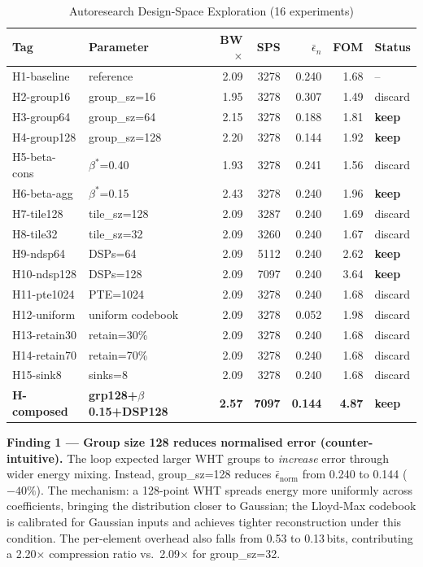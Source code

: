 \begin{table}[t]
\caption{Autoresearch Design-Space Exploration (16 experiments)}
\label{tab:dse}
\centering\small
\setlength{\tabcolsep}{4pt}
\begin{tabular}{llrrrrl}
\toprule
Tag & Parameter & BW$\times$ & SPS & $\bar\epsilon_n$ & FOM & Status \\
\midrule
H1-baseline  & reference           & 2.09 & 3278 & 0.240 & 1.68 & -- \\
\midrule
H2-group16   & group\_sz=16        & 1.95 & 3278 & 0.307 & 1.49 & discard \\
H3-group64   & group\_sz=64        & 2.15 & 3278 & 0.188 & 1.81 & \textbf{keep} \\
H4-group128  & group\_sz=128       & 2.20 & 3278 & 0.144 & 1.92 & \textbf{keep} \\
\midrule
H5-beta-cons & $\beta^*$=0.40      & 1.93 & 3278 & 0.241 & 1.56 & discard \\
H6-beta-agg  & $\beta^*$=0.15      & 2.43 & 3278 & 0.240 & 1.96 & \textbf{keep} \\
\midrule
H7-tile128   & tile\_sz=128        & 2.09 & 3287 & 0.240 & 1.69 & discard \\
H8-tile32    & tile\_sz=32         & 2.09 & 3260 & 0.240 & 1.67 & discard \\
\midrule
H9-ndsp64    & DSPs=64             & 2.09 & 5112 & 0.240 & 2.62 & \textbf{keep} \\
H10-ndsp128  & DSPs=128            & 2.09 & 7097 & 0.240 & 3.64 & \textbf{keep} \\
\midrule
H11-pte1024  & PTE=1024            & 2.09 & 3278 & 0.240 & 1.68 & discard \\
H12-uniform  & uniform codebook    & 2.09 & 3278 & 0.052 & 1.98 & discard \\
H13-retain30 & retain=30\%         & 2.09 & 3278 & 0.240 & 1.68 & discard \\
H14-retain70 & retain=70\%         & 2.09 & 3278 & 0.240 & 1.68 & discard \\
H15-sink8    & sinks=8             & 2.09 & 3278 & 0.240 & 1.68 & discard \\
\midrule
\textbf{H-composed} & \textbf{grp128+$\beta$0.15+DSP128} & \textbf{2.57} & \textbf{7097} & \textbf{0.144} & \textbf{4.87} & \textbf{keep} \\
\bottomrule
\end{tabular}
\end{table}

\textbf{Finding 1 --- Group size 128 reduces normalised error (counter-intuitive).}
The loop expected larger WHT groups to \emph{increase} error through
wider energy mixing. Instead, group\_sz=128 reduces $\bar\epsilon_\text{norm}$
from 0.240 to 0.144 ($-40\%$).  The mechanism: a 128-point WHT spreads
energy more uniformly across coefficients, bringing the distribution
closer to Gaussian; the Lloyd-Max codebook is calibrated for Gaussian
inputs and achieves tighter reconstruction under this condition.
The per-element overhead also falls from 0.53 to 0.13\,bits, contributing
a 2.20$\times$ compression ratio vs.\ 2.09$\times$ for group\_sz=32.

